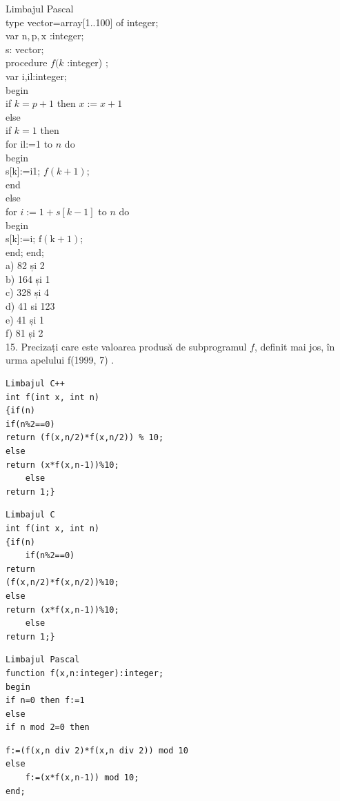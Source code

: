 \documentclass[10pt]{article}
\begin{document}
Limbajul Pascal\\[0pt]
type vector=array[1..100] of integer;\\
var $\mathrm{n}, \mathrm{p}, \mathrm{x}$ :integer;\\
s: vector;\\
procedure $f(k$ :integer) ;\\
var i,il:integer;\\
begin\\
if $k=p+1$ then $x:=x+1$\\
else\\
if $k=1$ then\\
for il:=1 to $n$ do\\
begin\\[0pt]
s[k]:=i1; $f(k+1)$;\\
end\\
else\\
for $i:=1+s[k-1]$ to $n$ do\\
begin\\[0pt]
s[k]:=i; $\mathrm{f}(\mathrm{k}+1)$;\\
end; end;\\
a) 82 și 2\\
b) 164 și 1\\
c) 328 și 4\\
d) 41 si 123\\
e) 41 și 1\\
f) 81 și 2\\
15. Precizați care este valoarea produsă de subprogramul $f$, definit mai jos, în urma apelului f(1999, 7) .

\begin{verbatim}
Limbajul C++
int f(int x, int n)
{if(n)
if(n%2==0)
return (f(x,n/2)*f(x,n/2)) % 10;
else
return (x*f(x,n-1))%10;
    else
return 1;}
\end{verbatim}

\begin{verbatim}
Limbajul C
int f(int x, int n)
{if(n)
    if(n%2==0)
return
(f(x,n/2)*f(x,n/2))%10;
else
return (x*f(x,n-1))%10;
    else
return 1;}
\end{verbatim}

\begin{verbatim}
Limbajul Pascal
function f(x,n:integer):integer;
begin
if n=0 then f:=1
else
if n mod 2=0 then
\end{verbatim}

\begin{verbatim}
f:=(f(x,n div 2)*f(x,n div 2)) mod 10
else
    f:=(x*f(x,n-1)) mod 10;
end;
\end{verbatim}
\end{document}
